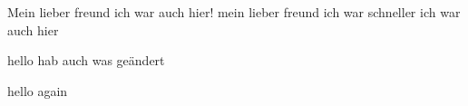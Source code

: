 
Mein lieber freund ich war auch hier!
mein lieber freund ich war schneller ich war auch hier





hello hab auch was geändert

hello again
